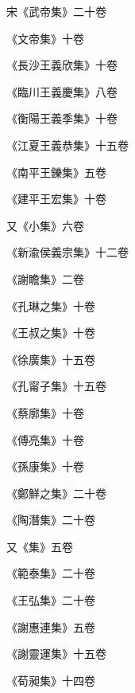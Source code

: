 \begin{pinyinscope}
 宋《武帝集》二十卷



 《文帝集》十卷



 《長沙王義欣集》十卷



 《臨川王義慶集》八卷



 《衡陽王義季集》十卷



 《江夏王義恭集》十五卷



 《南平王鑠集》五卷



 《建平王宏集》十卷



 又《小集》六卷



 《新渝侯義宗集》十二卷



 《謝瞻集》二卷



 《孔琳之集》十卷



 《王叔之集》十卷



 《徐廣集》十五卷



 《孔甯子集》十五卷



 《蔡廓集》十卷



 《傅亮集》十卷



 《孫康集》十卷



 《鄭鮮之集》二十卷



 《陶潛集》二十卷



 又《集》五卷



 《範泰集》二十卷



 《王弘集》二十卷



 《謝惠連集》五卷



 《謝靈運集》十五卷



 《荀昶集》十四卷




\end{pinyinscope}
